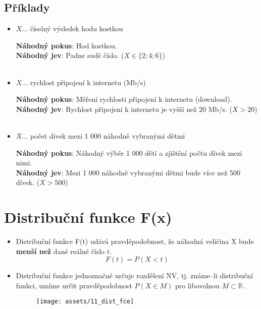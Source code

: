 \subsection*{Příklady}
\begin{itemize}
    \item[]  \begin{center}
              $X$... číselný výsledek hodu kostkou\\
          \end{center}
          \textbf{Náhodný pokus}: Hod kostkou. \\
          \textbf{Náhodný jev}: Padne sudé číslo. ($X \in \{2;4;6\}$) \\\\

    \item[]  \begin{center}
              $X$... rychlost připojení k internetu (Mb/s) \\
          \end{center}
          \textbf{Náhodný pokus}: Měření rychlosti připojení k internetu (download). \\
          \textbf{Náhodný jev}: Rychlost připojení k internetu je vyšší než 20 Mb/s.  ($X > 20$)\\\\

    \item[]  \begin{center}
              $X$... počet dívek mezi 1 000 náhodně vybranými dětmi \\
          \end{center}
          \textbf{Náhodný pokus}: Náhodný výběr 1 000 dětí a zjištění počtu dívek mezi nimi. \\
          \textbf{Náhodný jev}: Mezi 1 000 náhodně vybranými dětmi bude více než 500 dívek. ($X > 500$)
\end{itemize}





\section{Distribuční funkce F(x)}
\begin{itemize}
    \item Distribuční funkce F(t) udává pravděpodobnost, že náhodná veličina X bude \textbf{menší než} dané reálné číslo $t$.
          $$F(t) = P(X <t)$$
    \item Distribuční funkce jednoznačně určuje rozdělení NV, tj. známe--li distribuční funkci, umíme určit pravděpodobnost $P(X \in M)$ pro libovolnou $M\subset \mathbb{R}$.
          \begin{figure}[H]
              \centering
              \texttt{[image: assets/11\_dist\_fce]}
          \end{figure}
\end{itemize}

